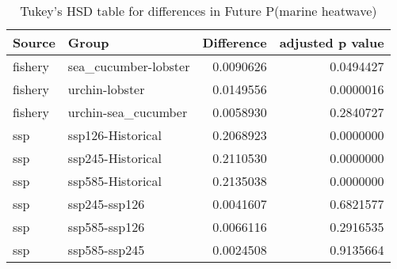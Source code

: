 \begin{table}

\caption{\label{tab:future_mhw_hsd}Tukey’s HSD table for differences in Future P(marine heatwave)}
\centering
\begin{tabular}[t]{llrr}
\toprule
Source & Group & Difference & adjusted p value\\
\midrule
fishery & sea\_cucumber-lobster & 0.0090626 & 0.0494427\\
fishery & urchin-lobster & 0.0149556 & 0.0000016\\
fishery & urchin-sea\_cucumber & 0.0058930 & 0.2840727\\
ssp & ssp126-Historical & 0.2068923 & 0.0000000\\
ssp & ssp245-Historical & 0.2110530 & 0.0000000\\
\addlinespace
ssp & ssp585-Historical & 0.2135038 & 0.0000000\\
ssp & ssp245-ssp126 & 0.0041607 & 0.6821577\\
ssp & ssp585-ssp126 & 0.0066116 & 0.2916535\\
ssp & ssp585-ssp245 & 0.0024508 & 0.9135664\\
\bottomrule
\end{tabular}
\end{table}